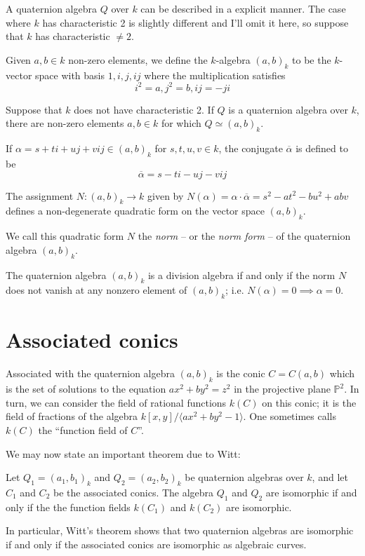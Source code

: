 \documentclass[11pt]{article}
\numberwithin{equation}{section}
\newcommand{\PP}{\mathbb{P}}
\begin{document}
A quaternion algebra \(Q\) over \(k\) can be described in a explicit
manner. The case where \(k\) has characteristic 2 is slightly
different and I'll omit it here, so suppose that \(k\) has
characteristic \(\ne 2\).

Given \(a,b \in k\) non-zero elements, we define the \(k\)-algebra
\((a,b)_k\) to be the \(k\)-vector space with basis \(1,i,j,ij\) where
the multiplication satisfies \[i^2 = a, j^2 = b, ij = -ji\]

\begin{theorem}
Suppose that \(k\) does not have characteristic 2.  If \(Q\) is a
quaternion algebra over \(k\), there are non-zero elements \(a,b \in
k\) for which \(Q \simeq (a,b)_k\).
\label{theorem:quaternion-described}
\end{theorem}

If \(\alpha = s + ti + uj + vij \in (a,b)_k\) for \(s,t,u,v \in k\),
the conjugate \(\overline{\alpha}\) is defined to be
\begin{equation*}
\overline{\alpha} = s - ti - uj - vij
\end{equation*}

\begin{proposition}
The assignment \(N:(a,b)_k \to k\) given by \(N(\alpha) = \alpha \cdot
\overline{\alpha} = s^2 - at^2 - bu^2 + abv\) defines a non-degenerate
quadratic form on the vector space \((a,b)_k\).
\label{proposition:norm}
\end{proposition}
We call this quadratic form \(N\) the \emph{norm} -- or the \emph{norm form} --
of the quaternion algebra \((a,b)_k\).

\begin{theorem}
The quaternion algebra \((a,b)_k\) is a division algebra if and only
if the norm \(N\) does not vanish at any nonzero element of \((a,b)_k\);
i.e. \(N(\alpha) = 0 \implies \alpha = 0\).
\label{theorem:division-algebra-condition}
\end{theorem}
\section{Associated conics}
\label{sec:org5e0f879}

Associated with the quaternion algebra \((a,b)_k\) is the conic
\(C=C(a,b)\) which is the set of solutions to the equation \(ax^2 +
by^2 = z^2\) in the projective plane \(\PP^2\).  In turn, we can
consider the field of rational functions \(k(C)\) on this conic; it is
the field of fractions of the algebra \(k[x,y]/\langle ax^2 + by^2 -
1\rangle.\) One sometimes calls \(k(C)\) the ``function field of \(C\)''.

We may now state an important theorem due to Witt:
\begin{theorem}
Let \(Q_1 = (a_1,b_1)_k\) and \(Q_2 = (a_2,b_2)_k\) be quaternion
algebras over \(k\), and let \(C_1\) and \(C_2\) be the associated
conics. The algebra \(Q_1\) and \(Q_2\) are isomorphic if and only if
the the function fields \(k(C_1)\) and \(k(C_2)\) are isomorphic.
\label{theorem:witt}
\end{theorem}

In particular, Witt's theorem shows that two quaternion algebras are
isomorphic if and only if the associated conics are isomorphic as
algebraic curves.
\end{document}
